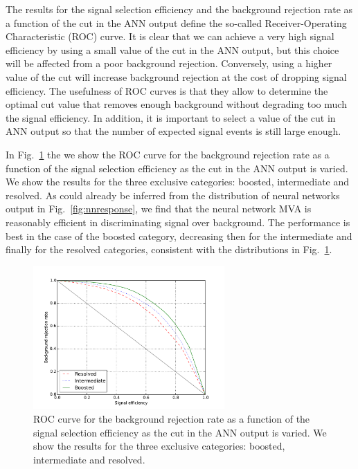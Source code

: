 The results for the signal selection efficiency and the 
background rejection rate as a function of the cut in the ANN output
define the so-called  Receiver-Operating Characteristic (ROC)
curve.
%
It is clear that we can achieve a very high signal efficiency by using
a small value of the cut in the ANN output, but this choice will be
affected from a poor background
rejection.
%
Conversely, using a higher value of the cut will increase background rejection at the
cost of dropping signal efficiency.
%
The usefulness of ROC curves is that they allow to determine the
optimal cut value that removes enough background without degrading too much the signal efficiency.
%
In addition, it is important to select a value of the cut in ANN output so that
the number of expected signal events is still large enough.


In Fig.~\ref{fig:exampleroc} the
we show the ROC curve for the background rejection rate as a function of the signal
  selection efficiency as the cut in the ANN output is varied.
  We show the results for the three exclusive categories: boosted, intermediate
  and resolved.
%
As could already be inferred from the distribution of neural
networks output in Fig.~\ref{fig:nnresponse}, we find
that the neural network MVA is reasonably efficient
in discriminating signal over background.
%
The performance is best in the case of the boosted category,
decreasing then for the intermediate and finally for the
resolved categories, consistent with the distributions in
Fig.~\ref{fig:exampleroc}.
%



\begin{figure}[t]
\begin{center}
\includegraphics[width=0.65\textwidth]{plots/roc.pdf}
\caption{\small ROC curve for the background rejection rate as a function of the signal
  selection efficiency as the cut in the ANN output is varied.
  We show the results for the three exclusive categories: boosted, intermediate
  and resolved.
}
\label{fig:exampleroc}
\end{center}
\end{figure}

